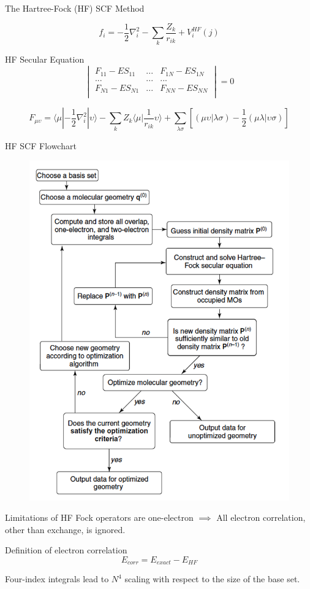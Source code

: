 \documentclass[aspectratio=169]{beamer}
\begin{document}
\begin{frame}{The Hartree-Fock (HF) SCF Method}

\begin{equation*}
    f_i = - \frac{1}{2}\nabla_i^2
    -\sum_k \frac{Z_k}{r_{ik}} + V_i^{HF}(j)
\end{equation*}

\begin{alertblock}{HF Secular Equation}
    \begin{equation*}
\begin{vmatrix}
F_{11}-ES_{11} & ... & F_{1N}-ES_{1N}\\
... & ... & ...\\
F_{N1}-ES_{N1} & ... & F_{NN}-ES_{NN}\\
\end{vmatrix}
= 0
\end{equation*}
\end{alertblock}

    \begin{equation*}
F_{\mu\upsilon} = \langle \mu | - \frac{1}{2}\nabla_i^2 | \upsilon \rangle
    -\sum_k Z_k \langle \mu |\frac{1}{r_{ik}}\upsilon \rangle + \sum_{\lambda \sigma} [ (\mu\upsilon| \lambda\sigma) - \frac{1}{2} (\mu\lambda| \upsilon\sigma)]
\end{equation*}

\end{frame}

\begin{frame}{HF SCF Flowchart}
\begin{figure}
    \centering
    \includegraphics[width=0.35\linewidth]{lectures/figures/2_HF_SCF_Flowchart.png}

\end{figure}
    
\end{frame}

\begin{frame}{Limitations of HF}
Fock operators are one-electron $\implies$ All electron correlation, other than exchange, is ignored.

\begin{alertblock}{Definition of electron correlation}
\begin{equation*}
    E_{corr} = E_{exact} - E_{HF} 
\end{equation*}
\end{alertblock}

Four-index integrals lead to $N^4$ scaling with respect to the size of the base set.

\end{frame}
\end{document}
